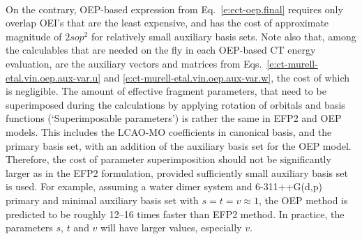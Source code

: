 \documentclass[aip,jcp,amsmath,amssymb,reprint,floatfix]{revtex4-1}
\begin{document}
%
\\ On the contrary, 
OEP\hyp{}based expression
from Eq.~\eqref{e:ect-oep.final} requires only overlap OEI's that are the least expensive, 
and has the cost of approximate magnitude of $2sop^2$ for relatively small auxiliary basis sets.
Note also that, among the calculables that are needed on the fly in each
OEP\hyp{}based CT energy evaluation, are the auxiliary vectors and matrices 
from Eqs.~\eqref{e:ct-murell-etal.vin.oep.aux-var.u}
and \eqref{e:ct-murell-etal.vin.oep.aux-var.w},
the cost of which is negligible. The amount of effective fragment parameters,
that need to be superimposed during the calculations by applying rotation
of orbitals and basis functions (`Superimposable parameters')
is rather the same in EFP2 and OEP models. 
This includes the LCAO\hyp{}MO coefficients in canonical basis,
and the primary basis set, with an addition of the auxiliary basis set
for the OEP model. Therefore, the cost of parameter superimposition should
not be significantly larger as in the EFP2 formulation, provided sufficiently 
small auxiliary basis set is used.
For example,
assuming a water dimer system and 6-311++G(d,p) primary and minimal auxiliary basis set
with $s=t=v\approx1$,
the OEP method is predicted to be roughly 12--16 times faster than EFP2 method. In practice,
the parameters $s$, $t$ and $v$ will have larger values, especially $v$.
\end{document}
